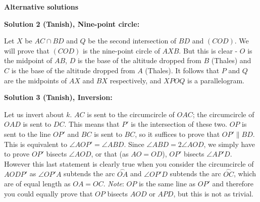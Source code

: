 \newpage

\textbf{Alternative solutions}

\textbf{Solution 2 (Tanish), Nine-point circle:} 

Let $X$ be $AC \cap BD$ and $Q$ be the second intersection of $BD$ and $(COD)$. We will prove that $(COD)$ is the nine-point circle of $AXB$. But this is clear - $O$ is the midpoint of $AB$, $D$ is the base of the altitude dropped from $B$ (Thales) and $C$ is the base of the altitude dropped from $A$ (Thales). It follows that $P$ and $Q$ are the midpoints of $AX$ and $BX$ respectively, and $XPOQ$ is a parallelogram.

\textbf{Solution 3 (Tanish), Inversion:}

Let us invert about $k$. $AC$ is sent to the circumcircle of $OAC$; the circumcircle of $OAD$ is sent to $DC$. This means that $P'$ is the intersection of these two. $OP$ is sent to the line $OP'$ and $BC$ is sent to $BC$, so it suffices to prove that $OP' \parallel BD$. This is equivalent to $\angle AOP' = \angle ABD$. Since $\angle ABD = 2\angle AOD$, we simply have to prove $OP'$ bisects $\angle AOD$, or that (as $AO = OD$), $OP'$ bisects $\angle AP'D.$ However this last statement is clearly true when you consider the circumcircle of $AODP'$ as $\angle OP'A$ subtends the arc $\overset{\frown}{OA}$ and $\angle OP'D$ subtends the arc $\overset{\frown}{OC}$, which are of equal length as $OA = OC$. \newline \newline
\emph{Note}: $OP$ is the same line as $OP'$ and therefore you could equally prove that $OP$ bisects $AOD$ or $APD$, but this is not as trivial.